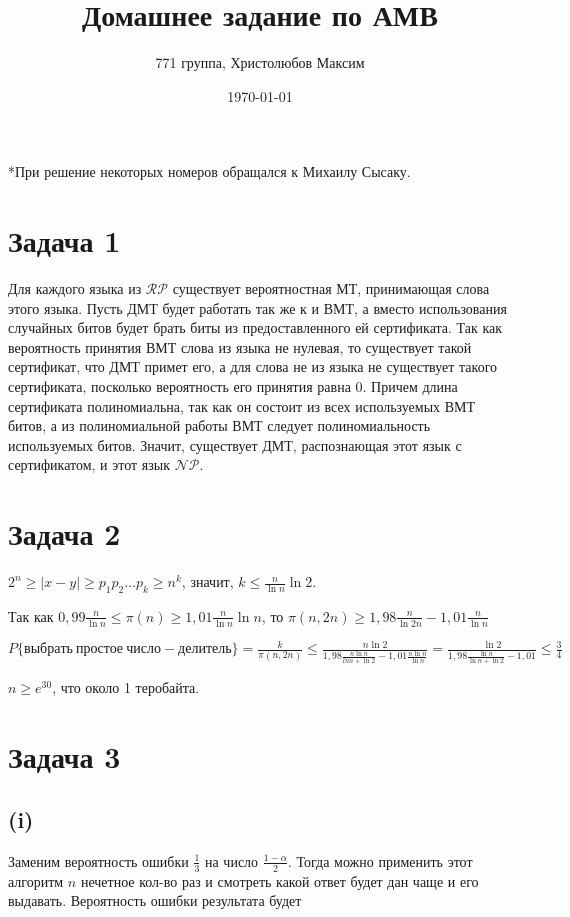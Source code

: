 \documentclass[a4paper,12pt]{article} %
\author{771 группа, Христолюбов Максим}
\title{Домашнее задание по АМВ}
\date{\today}
\begin{document}
	
	\maketitle
	
*При решение некоторых номеров обращался к Михаилу Сысаку.

\section{Задача 1}
\hspace{5mm}

Для каждого языка из $\mathcal{RP}$ существует вероятностная МТ, принимающая слова этого языка. Пусть ДМТ будет работать так же к и ВМТ, а вместо использования случайных битов будет брать биты из предоставленного ей сертификата. Так как вероятность принятия ВМТ слова из языка не нулевая, то существует такой сертификат, что ДМТ примет его, а для слова не из языка не существует такого сертификата, посколько вероятность его принятия равна $0$. Причем длина сертификата полиномиальна, так как он состоит из всех используемых ВМТ битов, а из полиномиальной работы ВМТ следует полиномиальность используемых битов. Значит, существует ДМТ, распознающая этот язык с сертификатом, и этот язык $\mathcal{NP}$.

\section{Задача 2}
\hspace{5mm}

$2^n\geq |x-y|\geq p_1p_2\ldots p_k\geq n^k$, значит, $k\leq \frac{n}{\ln{n}}\ln{2}$.

Так как $0,99\frac{n}{\ln{n}}\leq\pi(n)\geq 1,01\frac{n}{\ln{n}}\ln{n}$, то $\pi(n,2n)\geq 1,98\frac{n}{\ln{2n}}-1,01\frac{n}{\ln{n}}$

$P\{выбрать\ простое\ число-делитель\}=\frac{k}{\pi(n,2n)}\leq \frac{n\ln{2}}{1,98\frac{n\ln{n}}{ln{n}+\ln{2}}-1,01\frac{n\ln{n}}{\ln{n}}}=\frac{\ln{2}}{1,98\frac{\ln{n}}{\ln{n}+\ln{2}}-1,01}\leq\frac{3}{4}$

$n\geq e^{30}$, что около 1 теробайта.

\section{Задача 3}
\subsection{(i)}
\hspace{5mm}
Заменим вероятность ошибки $\frac{1}{3}$ на число $\frac{1-\alpha}{2}$. Тогда можно применить этот алгоритм $n$ нечетное кол-во раз и смотреть какой ответ будет дан чаще и его выдавать. Вероятность ошибки результата будет 
\end{document}

